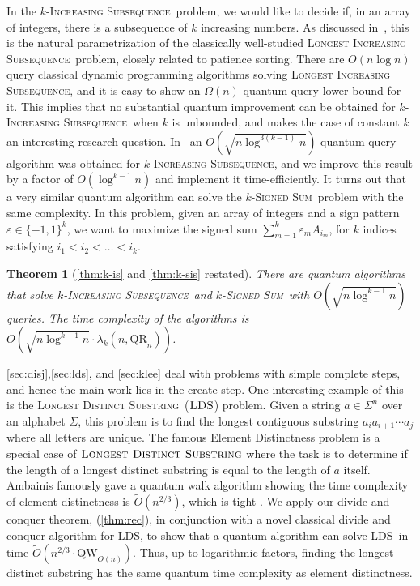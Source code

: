 \documentclass[12pt]{article}
\newcommand{\qr}{\mathrm{QR}}
\newcommand{\qw}{\mathrm{QW}}
\newcommand{\ISf}{\textsc{Increasing Subsequence}}
\newcommand{\LISf}{\textsc{Longest Increasing Subsequence}}
\newcommand{\ldsf}{\textsc{Longest Distinct Substring}}
\newcommand{\lds}{\textsc{LDS}}
\newcommand{\SiSf}{\textsc{Signed Sum}}
\newtheorem*{rtheorem}{Theorem}
\theoremstyle{definition}
\begin{document}
In the $k$-\ISf \ problem, we would like to decide if, in an array of integers, there is a subsequence of $k$ increasing numbers.
As discussed in~\cite{CKKSW22}, this is the natural parametrization of the classically well-studied \LISf \ problem, closely related to patience sorting. There are $O(n \log n)$ query classical dynamic programming algorithms solving \LISf, and it is easy to show an $\Omega(n)$ quantum query lower bound for it. This implies that no substantial quantum improvement can be obtained for $k$-\ISf \ when $k$ is unbounded, and makes the case of constant $k$ an interesting research question. In~\cite{CKKSW22} an $O(\sqrt{n \log^{3(k-1)} n})$ quantum query algorithm was obtained
for $k$-\ISf, and we improve this result by a factor of $O(\log^{k-1} n)$ and implement it time-efficiently.
It turns out that a very similar quantum algorithm can solve the $k$-\SiSf \ problem with the same complexity.
In this problem, given an array of integers and a sign pattern $\varepsilon \in \{-1,1\}^k$, 
we want to maximize the signed sum $\sum_{m =1}^k  \varepsilon_m A_{i_m}$, for  $k$ indices satisfying
$i_1  < i_2< \ldots < i_k$.


\begin{rtheorem}[\cref{thm:k-is} and \cref{thm:k-sis} {\normalfont restated}]
There are quantum algorithms that solve $k$-\ISf \ and $k$-\SiSf \ with $O( \sqrt{n \log^{k-1} n})$ queries. 
The  time complexity of the algorithms is $O(\sqrt{n \log^{k-1} n} \cdot \lambda_k(n,\qr_n))$.
\end{rtheorem}



\cref{sec:disj},\cref{sec:lds}, and \cref{sec:klee} deal with problems with simple complete steps, and hence the main work lies in the create step. One interesting example of this is the \ldsf\ ($\lds$) problem.  Given a string $a \in \Sigma^n$ over an alphabet $\Sigma$, this 
problem is to find the longest contiguous substring $a_i a_{i+1}\cdots a_j$ where all letters are unique.  The famous Element Distinctness problem is a special case of $\ldsf$ where the task is to determine if the length of a longest distinct substring is equal to the length of $a$ itself.  
Ambainis \cite{ambainis2007quantum} famously gave a quantum walk algorithm showing the time complexity of element distinctness is $\tilde O(n^{2/3})$, which is tight \cite{aaronson2004quantum}. 
We apply our divide and conquer theorem, (\cref{thm:rec}), in conjunction with a novel classical divide and conquer algorithm for \lds, to show that a quantum algorithm can solve \lds \ in time $\widetilde{O}(n^{2/3}\cdot \qw_{O(n)})$. 
Thus, up to logarithmic factors, finding the longest distinct substring has the same quantum time complexity as element distinctness. 
\end{document}

